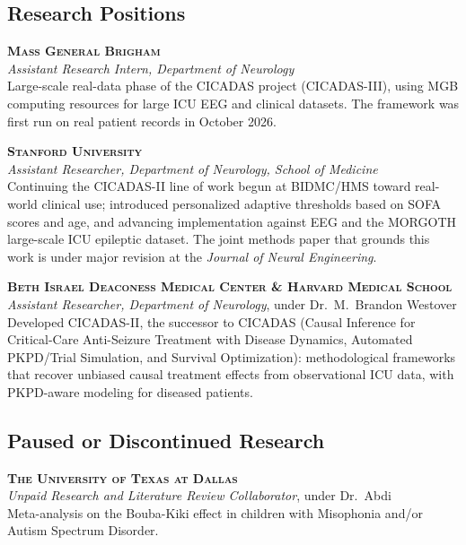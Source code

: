 \documentclass[11pt,letterpaper]{report} %
\begin{document}
    \subsection*{Research Positions}
    \begin{tablist}
        \item[2026--]
        \tab{}\small{\textbf{\textsc{Mass General Brigham}}} \\[0.15em]
                             \small{\textit{Assistant Research Intern, Department of Neurology}} \\
                             Large-scale real-data phase of the CICADAS project (CICADAS-III), using MGB computing resources for large ICU EEG and clinical datasets. The framework was first run on real patient records in October 2026.
        \item[2026--]   \tab{}\small{\textbf{\textsc{Stanford University}}} \\[0.15em]
                              \small{\textit{Assistant Researcher, Department of Neurology, School of Medicine}} \\
                              Continuing the CICADAS-II line of work begun at BIDMC/HMS toward real-world clinical use; introduced personalized adaptive thresholds based on SOFA scores and age, and advancing implementation against EEG and the MORGOTH large-scale ICU epileptic dataset. The joint methods paper that grounds this work is under major revision at the \textit{Journal of Neural Engineering}.
        \item[2025--26] \tab{}\small{\textbf{\textsc{Beth Israel Deaconess Medical Center \& Harvard Medical School}}} \\[0.15em]
                              \small{\textit{Assistant Researcher, Department of Neurology}}, under Dr.~M.~Brandon Westover \\
                              Developed CICADAS-II, the successor to CICADAS (Causal Inference for Critical-Care Anti-Seizure Treatment with Disease Dynamics, Automated PKPD/Trial Simulation, and Survival Optimization): methodological frameworks that recover unbiased causal treatment effects from observational ICU data, with PKPD-aware modeling for diseased patients.
    \end{tablist}

    \subsection*{Paused or Discontinued Research}
    \begin{tablist}
        \item[2022--24] \tab{}\small{\textbf{\textsc{The University of Texas at Dallas}}}\\[0.15em]
                              \textit{Unpaid Research and Literature Review Collaborator}, under Dr.~Abdi \\
                              Meta-analysis on the Bouba-Kiki effect in children with Misophonia and/or Autism Spectrum Disorder.
    \end{tablist}
\end{document}
